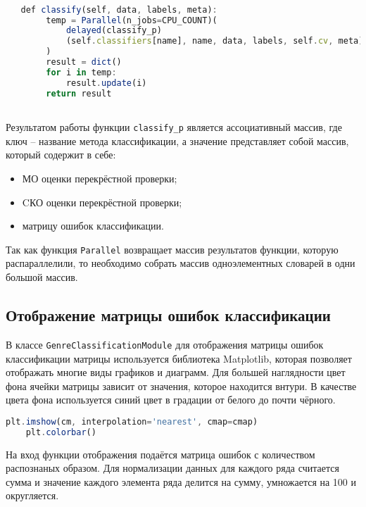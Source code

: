 \begin{lstlisting}[language=TypeScript, label=lst:classify]

   def classify(self, data, labels, meta):
        temp = Parallel(n_jobs=CPU_COUNT)(
            delayed(classify_p)
            (self.classifiers[name], name, data, labels, self.cv, meta) for name in self.classifiers
        )
        result = dict()
        for i in temp:
            result.update(i)
        return result



\end{lstlisting}

Результатом работы функции \texttt{classify_p} является ассоциативный массив, где ключ -- название метода классификации, а значение представляет собой массив, который содержит в себе:
\begin{itemize}
    \item МО оценки перекрёстной проверки;
    \item CКО оценки перекрёстной проверки;
    \item матрицу ошибок классификации.
\end{itemize}

Так как функция \texttt{Parallel} возвращает массив результатов функции, которую распараллелили, то необходимо собрать массив одноэлементных словарей в одни большой массив.


\subsection{Отображение матрицы ошибок классификации}

В классе \texttt{GenreClassificationModule} для  отображения матрицы ошибок классификации матрицы используется библиотека Matplotlib, которая позволяет отображать многие виды графиков и диаграмм. Для большей наглядности цвет фона ячейки матрицы зависит от значения, которое находится внтури. В качестве цвета фона используется синий цвет в градации от белого до почти чёрного.

\begin{lstlisting}[language=TypeScript, label=lst:normalize]
    plt.imshow(cm, interpolation='nearest', cmap=cmap)
    plt.colorbar()
\end{lstlisting}

На вход функции отображения подаётся матрица ошибок с количеством распознаных образом. Для нормализации данных для каждого ряда считается сумма и значение каждого элемента ряда делится на сумму, умножается на 100 и округляется.

